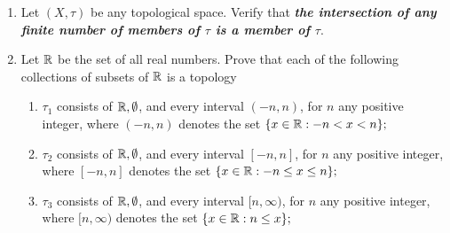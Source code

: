 \documentclass[10pt,a4paper]{report}
\begin{document}
\begin{enumerate}
\noindent
{}

\item Let $(X, \tau)$ be any topological space.  Verify that \textbf{\textit{the intersection of any finite number of members of $\tau$ is a member of $\tau$}}.

\item Let $\mathbb{R}$ be the set of all real numbers.  Prove that each of the following collections of subsets of $\mathbb{R}$ is a topology
\begin{enumerate}[label=(\roman*)]
	\item $\tau_1$ consists of $\mathbb{R}, \emptyset$, and every interval $(-n,n)$, for $n$ any positive integer, where $(-n,n)$ denotes the set $\{x \in\mathbb{R}:-n<x<n\};$
	\item $\tau_2$ consists of $\mathbb{R}, \emptyset$, and every interval $[-n,n]$, for $n$ any positive integer, where $[-n,n]$ denotes the set $\{x \in\mathbb{R}:-n\le x\le n\};$
	\item $\tau_3$ consists of $\mathbb{R}, \emptyset$, and every interval $[n,\infty)$, for $n$ any positive integer, where $[n,\infty)$ denotes the set $\{x \in\mathbb{R}:n\le x\};$
\end{enumerate}


\end{enumerate}
\end{document}
